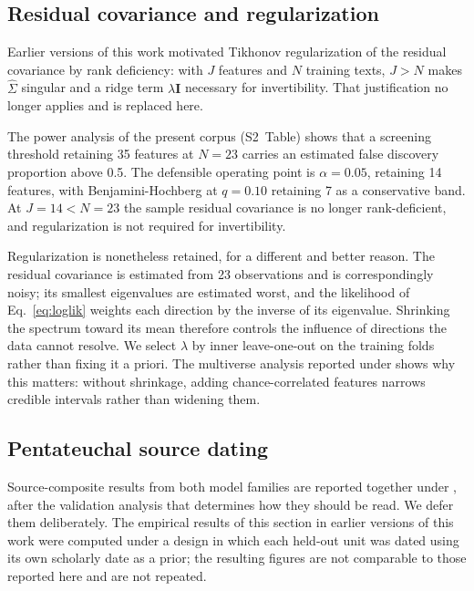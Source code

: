 \subsection*{Residual covariance and regularization}

Earlier versions of this work motivated Tikhonov regularization of the
residual covariance by rank deficiency: with $J$ features and $N$ training
texts, $J > N$ makes $\hat{\Sigma}$ singular and a ridge term
$\lambda \mathbf{I}$ necessary for invertibility.  That justification no
longer applies and is replaced here.

The power analysis of the present corpus (S2~Table) shows that a screening
threshold retaining 35 features at $N = 23$ carries an estimated false
discovery proportion above 0.5.  The defensible operating point is
$\alpha = 0.05$, retaining 14 features, with Benjamini-Hochberg at
$q = 0.10$ retaining 7 as a conservative band.  At $J = 14 < N = 23$ the
sample residual covariance is no longer rank-deficient, and regularization
is not required for invertibility.

Regularization is nonetheless retained, for a different and better reason.
The residual covariance is estimated from 23 observations and is
correspondingly noisy; its smallest eigenvalues are estimated worst, and
the likelihood of Eq.~\ref{eq:loglik} weights each direction by the inverse
of its eigenvalue.  Shrinking the spectrum toward its mean therefore
controls the influence of directions the data cannot resolve.  We select
$\lambda$ by inner leave-one-out on the training folds rather than fixing
it a priori.  The multiverse analysis reported under 
shows why this matters: without shrinkage, adding chance-correlated
features narrows credible intervals rather than widening them.

\subsection*{Pentateuchal source dating}

Source-composite results from both model families are reported together
under , after the validation analysis that determines
how they should be read.  We defer them deliberately.  The empirical
results of this section in earlier versions of this work were computed
under a design in which each held-out unit was dated using its own
scholarly date as a prior; the resulting figures are not comparable to
those reported here and are not repeated.

